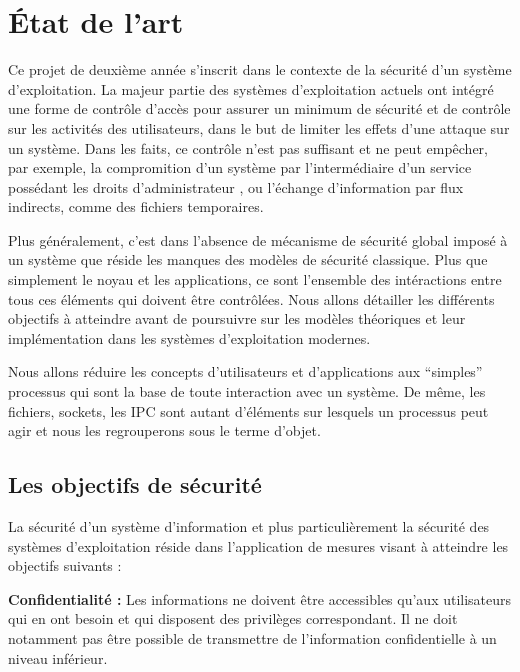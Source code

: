 \section{\'Etat de l'art}

Ce projet de deuxième année s'inscrit dans le contexte de la sécurité d'un système d'exploitation. La majeur partie des systèmes d'exploitation actuels ont intégré une forme de contrôle d'accès pour assurer un minimum de sécurité et de contrôle sur les activités des utilisateurs, dans le but de limiter les effets d'une attaque sur un système. Dans les faits, ce contrôle n'est pas suffisant et ne peut empêcher, par exemple, la compromition d'un système par l'intermédiaire d'un service possédant les droits d'administrateur \cite{TIOF}, ou l'échange d'information par flux indirects, comme des fichiers temporaires.

Plus généralement, c'est dans l'absence de mécanisme de sécurité global imposé à un système que réside les manques des modèles de sécurité classique. Plus que simplement le noyau et les applications, ce sont l'ensemble des intéractions entre tous ces éléments qui doivent être contrôlées. Nous allons détailler les différents objectifs à atteindre avant de poursuivre sur les modèles théoriques et leur implémentation dans les systèmes d'exploitation modernes.


Nous allons réduire les concepts d'utilisateurs et d'applications aux ``simples'' processus qui sont la base de toute interaction avec un système. De même, les fichiers, sockets, les IPC sont autant d'éléments sur lesquels un processus peut agir et nous les regrouperons sous le terme d'objet.

\subsection{Les objectifs de sécurité}

La sécurité d'un système d'information et plus particulièrement la sécurité des systèmes d'exploitation réside dans l'application de mesures visant à atteindre les objectifs suivants :

\textbf{Confidentialité :}
Les informations ne doivent être accessibles qu'aux utilisateurs qui en ont besoin et qui disposent des privilèges correspondant. Il ne doit notamment pas être possible de transmettre de l'information confidentielle à un niveau inférieur.

